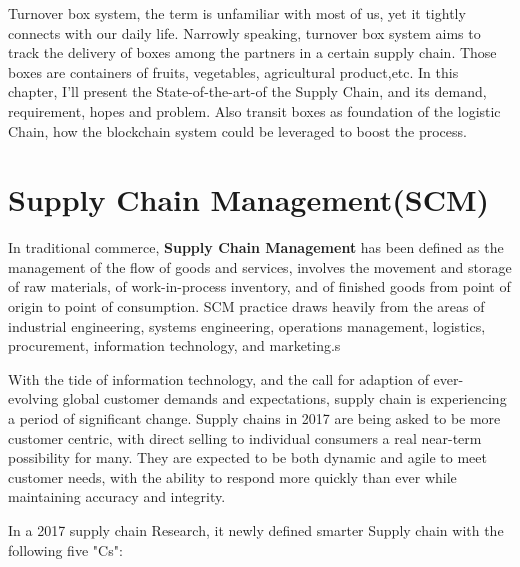 Turnover box system, the term is unfamiliar with most of us, yet it tightly connects with
our daily life. Narrowly speaking, turnover box system aims to track the delivery of boxes
among the partners in a certain supply chain. Those boxes are containers of fruits, vegetables,
agricultural product,etc. In this chapter, I'll present the State-of-the-art-of the Supply Chain, and its demand, requirement, hopes and problem. Also transit boxes as foundation of the logistic Chain, how the blockchain system could be leveraged to boost the process.

\section{Supply Chain Management(SCM)} 
In traditional commerce, \textbf{Supply Chain Management} has been defined as the management of the flow of goods and services,\cite{sc1} involves the movement and storage of raw materials, of work-in-process inventory, and of finished goods from point of origin to point of consumption. SCM practice draws heavily from the areas of industrial engineering, systems engineering, operations management, logistics, procurement, information technology, and marketing.s

With the tide of information technology, and the call for adaption of ever-evolving global customer demands and expectations, supply chain is experiencing a period of significant change. Supply chains in 2017 are being asked to be more customer centric, with direct selling to individual consumers a real near-term possibility for many. They are expected to be both dynamic and agile to
meet customer needs, with the ability to respond more quickly than ever while maintaining accuracy
and integrity.\cite{sc2}

In a 2017 supply chain Research, it newly defined smarter Supply chain with the following five "Cs":\cite{sc3}


